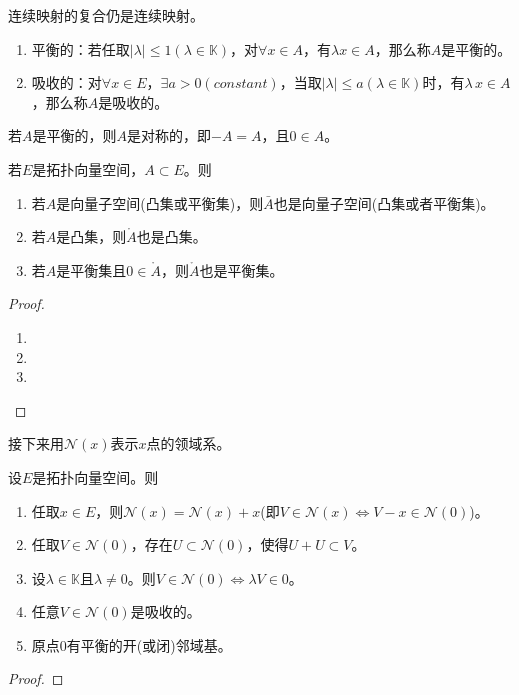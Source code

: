\begin{hint}
	连续映射的复合仍是连续映射。
\end{hint}

\begin{definition}
	\begin{enumerate}
		\item 平衡的：若任取$|\lambda|\leq 1(\lambda\in \mathbb{K}) $，对$\forall x\in A$，有$\lambda x\in A $，那么称$A$是平衡的。
		\item 吸收的：对$\forall x\in E $，$\exists a>0 (constant)$，当取$|\lambda|\leq a(\lambda \in \mathbb{K})$时，有$\lambda \, x\in A$，那么称$A$是吸收的。
	\end{enumerate}
\end{definition}

\begin{remark}
	若$A$是平衡的，则$A$是对称的，即$-A=A$，且$0\in A$。
\end{remark}

\begin{theorem}
	若$E$是拓扑向量空间，$A\subset E$。则
	\begin{enumerate}
		\item 若$A$是向量子空间(凸集或平衡集)，则$\bar{A}$也是向量子空间(凸集或者平衡集)。
		\item 若$A$是凸集，则$\mathring{A}$也是凸集。
		\item 若$A$是平衡集且$0\in \mathring{A} $，则$\mathring{A}$也是平衡集。
	\end{enumerate}
\end{theorem}

\begin{proof}
	\begin{enumerate}
		\item 
		\item
		\item
	\end{enumerate}
\end{proof}

接下来用$\mathcal{N}(x)$表示$x$点的领域系。
\begin{theorem}
	设$E$是拓扑向量空间。则
	\begin{enumerate}
		\item 任取$x\in E $，则$\mathcal{N}(x)=\mathcal{N}(x)+x $(即$V\in \mathcal{N}(x)\Leftrightarrow V-x\in \mathcal{N}(0) $)。
		\item 任取$V\in \mathcal{N}(0) $，存在$U\subset \mathcal{N}(0) $，使得$U+U\subset V $。
		\item 设$\lambda\in \mathbb{K} $且$\lambda\neq 0 $。则$V\in \mathcal{N}(0)\Leftrightarrow \lambda V\in \mathcal{0} $。
		\item 任意$V\in \mathcal{N}(0) $是吸收的。
		\item 原点0有平衡的开(或闭)邻域基。
	\end{enumerate}
\end{theorem}
\begin{proof}
	
\end{proof}


